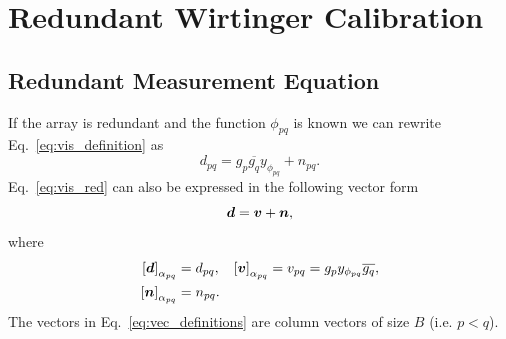 \documentclass[useAMS,usenatbib]{mn2e}
\newcommand{\bd}{\bmath{d}}
\newcommand{\bv}{\bmath{v}}
\newcommand{\bn}{\bmath{n}}
\newcommand{\conj}[1]{\overline{#1}}
\begin{document}
% 

\section{Redundant Wirtinger Calibration}

\subsection{Redundant Measurement Equation}
\label{sec:r_mes}
If the array is redundant and the function $\phi_{pq}$ is known we can rewrite Eq.~\eqref{eq:vis_definition} as
\begin{equation}
\label{eq:vis_red}
d_{pq} = g_{p}\conj{g_q}y_{\phi_{pq}} + n_{pq}.
\end{equation}
Eq.~\eqref{eq:vis_red} can also be expressed in the following vector form 
\begin{equation}
\label{eq:vis_red_vec}
\bd = \bv + \bn, 
\end{equation}
where 
\begin{align}
 \left [ \bd \right]_{\alpha_{pq}} &= d_{pq}, & \left [ \bv \right ]_{\alpha_{pq}} &= v_{pq}=g_p y_{\phi_{pq}} \conj{g_q},\nonumber\\
 \left [ \bn \right ]_{\alpha_{pq}} &= n_{pq}. &  &\label{eq:vec_definitions}
\end{align}
The vectors in Eq.~\eqref{eq:vec_definitions} are column vectors of size $B$ (i.e. $p<q$).
\end{document}
